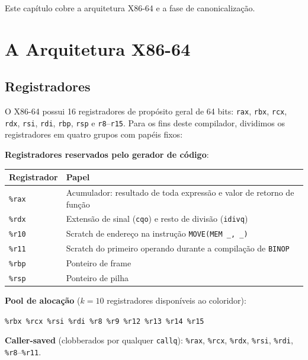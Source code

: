 Este capítulo cobre a arquitetura X86-64 e a fase de canonicalização.

\section{A Arquitetura X86-64}

\subsection{Registradores}

O X86-64 possui 16 registradores de propósito geral de 64 bits:
\texttt{rax}, \texttt{rbx}, \texttt{rcx}, \texttt{rdx}, \texttt{rsi},
\texttt{rdi}, \texttt{rbp}, \texttt{rsp} e \texttt{r8}–\texttt{r15}.
Para os fins deste compilador, dividimos os registradores em quatro grupos
com papéis fixos:

\medskip
\noindent
\textbf{Registradores reservados pelo gerador de código}:

\begin{center}
  \begin{tabular}{ll}
    \toprule
    Registrador & Papel \\
    \midrule
    \texttt{\%rax} & Acumulador: resultado de toda expressão e valor
    de retorno de função \\
    \texttt{\%rdx} & Extensão de sinal (\texttt{cqo}) e resto de
    divisão (\texttt{idivq}) \\
    \texttt{\%r10} & Scratch de endereço na instrução
    \texttt{MOVE(MEM\,\_,\,\_)} \\
    \texttt{\%r11} & Scratch do primeiro operando durante a
    compilação de \texttt{BINOP} \\
    \texttt{\%rbp} & Ponteiro de frame \\
    \texttt{\%rsp} & Ponteiro de pilha \\
    \bottomrule
  \end{tabular}
\end{center}

\medskip
\noindent
\textbf{Pool de alocação} ($k = 10$ registradores disponíveis ao coloridor):

\begin{center}
  \texttt{\%rbx \quad \%rcx \quad \%rsi \quad \%rdi \quad \%r8 \quad \%r9
  \quad \%r12 \quad \%r13 \quad \%r14 \quad \%r15}
\end{center}

\medskip
\noindent
\textbf{Caller-saved} (clobberados por qualquer \texttt{callq}):
\texttt{\%rax}, \texttt{\%rcx}, \texttt{\%rdx}, \texttt{\%rsi},
\texttt{\%rdi}, \texttt{\%r8}–\texttt{\%r11}.

